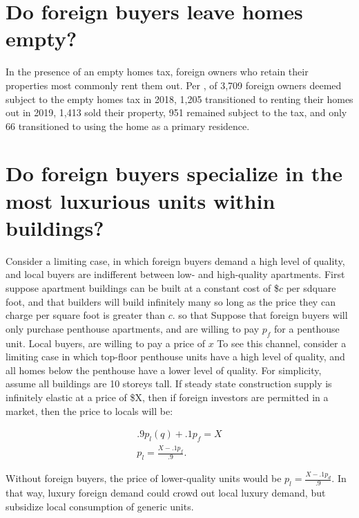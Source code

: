 \documentclass[12pt]{article}
\begin{document}
\section{Do foreign buyers leave homes empty?}

In the presence of an empty homes tax, foreign owners who retain their
properties most commonly rent them out. Per \textcite{specTax2019}, of 3,709
foreign owners deemed subject to the empty homes tax in 2018, 1,205
transitioned to renting their homes out in 2019, 1,413 sold their property, 951
remained subject to the tax, and only 66 transitioned to using the home as a
primary residence. 

\section{Do foreign buyers specialize in the most luxurious units within buildings?}

Consider a limiting case, in which foreign buyers demand a high level of quality, and local buyers are indifferent between low- and high-quality apartments. First suppose apartment buildings can be built at a constant cost of \$$c$ per sdquare foot, and that builders will build infinitely many so long as the price they can charge per square foot is greater than $c$. so that Suppose that foreign buyers will only purchase penthouse apartments, and are willing to pay $p_{f}$ for a penthouse unit. Local buyers, are willing to pay a price of $x$
To see this channel, consider a limiting case
in which top-floor penthouse units have a high level of quality, and all homes
below the penthouse have a lower level of quality. For simplicity, assume all
buildings are 10 storeys tall. If steady state construction supply is
infinitely elastic at a price of \$X, then if foreign investors are permitted
in a market, then the price to locals will be:

\begin{align}
	.9p_{l}(q) + .1p_{f} = X\\
	p_{l} = \frac{X - .1p_{f}}{.9}.
\end{align}

Without foreign buyers, the price of lower-quality units would be $p_{l} =
\frac{X-.1p_{d}}{.9}$. In that way, luxury foreign demand could crowd out local
luxury demand, but subsidize local consumption of generic units.
\end{document}
